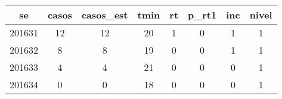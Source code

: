 \begin{tabular}{c|ccccccc}
  \hline
se & casos & casos\_est & tmin & rt & p\_rt1 & inc & nivel \\ 
  \hline
201631 & 12 & 12 & 20 & 1 & 0 & 1 & 1 \\ 
  201632 & 8 & 8 & 19 & 0 & 0 & 1 & 1 \\ 
  201633 & 4 & 4 & 21 & 0 & 0 & 0 & 1 \\ 
  201634 & 0 & 0 & 18 & 0 & 0 & 0 & 1 \\ 
   \hline
\end{tabular}

